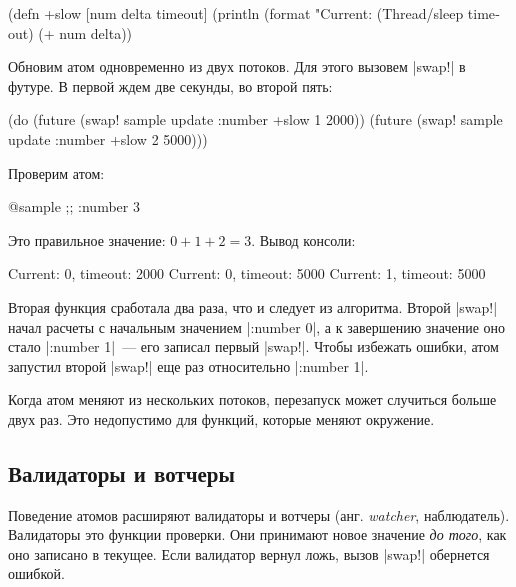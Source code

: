\begin{english}
  \begin{clojure}
(defn +slow
  [num delta timeout]
  (println (format "Current: %
  (Thread/sleep timeout)
  (+ num delta))
  \end{clojure}
\end{english}

Обновим атом одновременно из двух потоков. Для этого вызовем \spverb|swap!| в
футуре. В первой ждем две секунды, во второй пять:

\begin{english}
  \begin{clojure}
(do (future (swap! sample update :number +slow 1 2000))
    (future (swap! sample update :number +slow 2 5000)))
  \end{clojure}
\end{english}

\noindent
Проверим атом:

\begin{english}
  \begin{clojure}
@sample ;; {:number 3}
  \end{clojure}
\end{english}

\noindent
Это правильное значение: $0 + 1 + 2 = 3$. Вывод консоли:

\begin{english}
  \begin{text}
Current: 0, timeout: 2000
Current: 0, timeout: 5000
Current: 1, timeout: 5000
  \end{text}
\end{english}

Вторая функция сработала два раза, что и следует из алгоритма. Второй
\spverb|swap!| начал расчеты с начальным значением \spverb|{:number 0}|, а к
завершению значение оно стало \spverb|{:number 1}|~--- его записал первый
\spverb|swap!|. Чтобы избежать ошибки, атом запустил второй \spverb|swap!| еще
раз относительно \spverb|{:number 1}|.

Когда атом меняют из нескольких потоков, перезапуск может случиться больше двух
раз. Это недопустимо для функций, которые меняют окружение.

\subsection{Валидаторы и вотчеры}

Поведение атомов расширяют валидаторы и вотчеры (анг. \emph{watcher},
наблюдатель). Валидаторы это функции проверки. Они принимают новое значение
\emph{до того}, как оно записано в текущее. Если валидатор вернул ложь, вызов
\spverb|swap!| обернется ошибкой.

